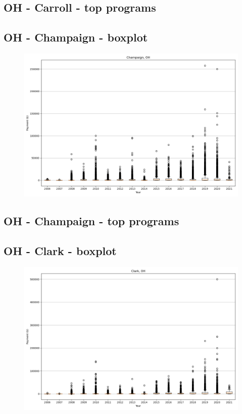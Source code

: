 \subsection*{OH - Carroll - top programs}

\newpage
\subsection*{OH - Champaign - boxplot}
\begin{figure}[h]
\centering
\includegraphics[width=7in]{../output/boxplots/counties/Champaign-OH_boxplot.png}
\end{figure}


\subsection*{OH - Champaign - top programs}

\newpage
\subsection*{OH - Clark - boxplot}
\begin{figure}[h]
\centering
\includegraphics[width=7in]{../output/boxplots/counties/Clark-OH_boxplot.png}
\end{figure}


